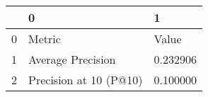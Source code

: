 \begin{tabular}{lll}
\toprule
 & 0 & 1 \\
\midrule
0 & Metric & Value \\
1 & Average Precision & 0.232906 \\
2 & Precision at 10 (P@10) & 0.100000 \\
\bottomrule
\end{tabular}
